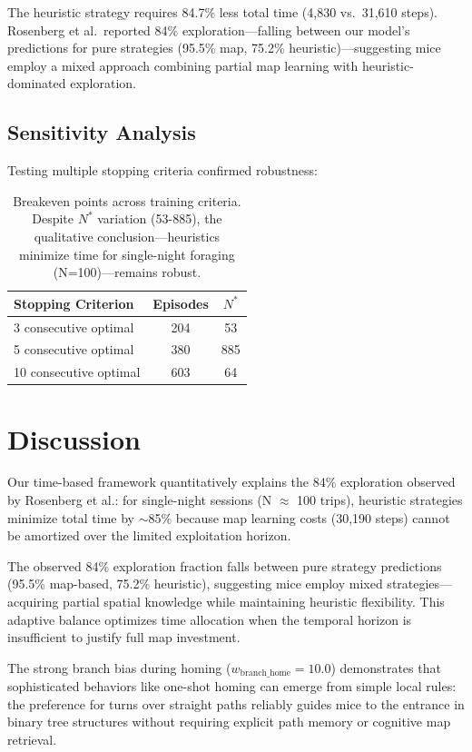 The heuristic strategy requires 84.7\% less total time (4,830 vs.\ 31,610 steps). Rosenberg et al.\ reported 84\% exploration—falling between our model's predictions for pure strategies (95.5\% map, 75.2\% heuristic)—suggesting mice employ a mixed approach combining partial map learning with heuristic-dominated exploration.

\subsection{Sensitivity Analysis}

Testing multiple stopping criteria confirmed robustness:

\begin{table}[h]
\centering
\small
\begin{tabular}{lcc}
\toprule
Stopping Criterion & Episodes & $N^*$ \\
\midrule
3 consecutive optimal & 204 & 53 \\
5 consecutive optimal & 380 & 885 \\
10 consecutive optimal & 603 & 64 \\
\bottomrule
\end{tabular}
\caption{Breakeven points across training criteria. Despite $N^*$ variation (53-885), the qualitative conclusion—heuristics minimize time for single-night foraging (N=100)—remains robust.}
\end{table}

\section{Discussion}

Our time-based framework quantitatively explains the 84\% exploration observed by Rosenberg et al.: for single-night sessions (N $\approx$ 100 trips), heuristic strategies minimize total time by $\sim$85\% because map learning costs (30,190 steps) cannot be amortized over the limited exploitation horizon.

The observed 84\% exploration fraction falls between pure strategy predictions (95.5\% map-based, 75.2\% heuristic), suggesting mice employ mixed strategies—acquiring partial spatial knowledge while maintaining heuristic flexibility. This adaptive balance optimizes time allocation when the temporal horizon is insufficient to justify full map investment.

The strong branch bias during homing ($w_{\text{branch\_home}} = 10.0$) demonstrates that sophisticated behaviors like one-shot homing can emerge from simple local rules: the preference for turns over straight paths reliably guides mice to the entrance in binary tree structures without requiring explicit path memory or cognitive map retrieval.

